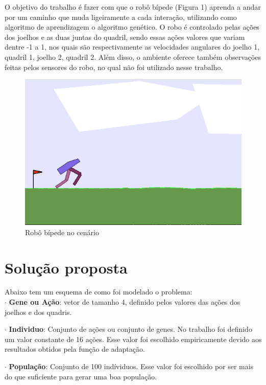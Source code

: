 \documentclass[article, a4paper, 12pt]{article}
\begin{document}
O objetivo do trabalho é fazer com que o robô bípede (Figura 1) aprenda a andar por um caminho que muda ligeiramente a cada interação, utilizando como algoritmo de aprendizagem o algoritmo genético. O robo é controlado pelas ações dos joelhos e as duas juntas do quadril, sendo essas ações valores que variam dentre -1 a 1, nos quais são respectivamente as velocidades angulares do joelho 1, quadril 1, joelho 2, quadril 2. Além disso, o ambiente oferece também observações feitas pelos sensores do robo, no qual não foi utilizado nesse trabalho.

\begin{figure}[!htb]
     \centering
     \includegraphics[scale=0.5]{img/robot_begin.png}
     \caption{Robô bípede no cenário}
     \label{fig1}
\end{figure}

\section{Solução proposta}

Abaixo tem um esquema de como foi modelado o problema: \\

$\cdot$ \textbf{Gene ou Ação}: vetor de tamanho 4, definido pelos valores das ações dos joelhos e dos quadris.

$\cdot$ \textbf{Individuo}: Conjunto de ações ou conjunto de genes. No trabalho foi definido um valor constante de 16 ações. Esse valor foi escolhido empiricamente devido aos resultados obtidos pela função de adaptação.

$\cdot$ \textbf{População}: Conjunto de 100 indíviduos. Esse valor foi escolhido por ser mais do que suficiente para gerar uma boa população. 
\end{document}

